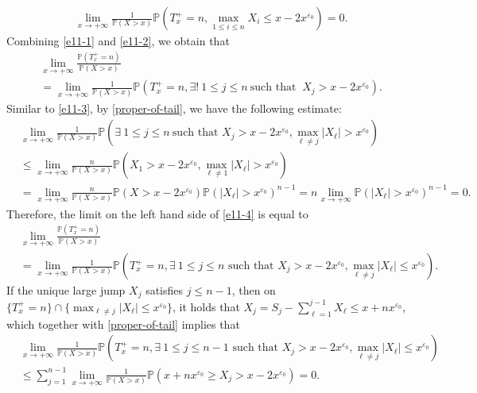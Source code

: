 \documentclass[11pt]{article}
\numberwithin{equation}{section}
\begin{document}
\begin{align}\label{e11-2}
	& \lim_{x\to+\infty} \frac{1}{\mathbb{P}(X>x)} \mathbb{P}\left(T_x^+=n, \max_{1\leq i\leq n} X_i \leq x-2x^{\varepsilon_0}\right)= 0. 
\end{align}
Combining \eqref{e11-1} and \eqref{e11-2}, we obtain that
\begin{align}\label{e11-4}
	& \lim_{x\to+\infty} \frac{\mathbb{P}\left(T_x^+=n\right)}{\mathbb{P}(X>x)} \nonumber\\
	&= \lim_{x\to+\infty} \frac{1}{\mathbb{P}(X>x)}\mathbb{P}\left(T_x^+=n, \exists !\ 1\leq j\leq n\ \mbox{such that } \ X_j > x-2x^{\varepsilon_0}\right).
\end{align}
Similar to \eqref{e11-3}, by \eqref{proper-of-tail}, we have the following estimate:
\begin{align}
	 & \lim_{x\to +\infty} \frac{1}{\mathbb{P}(X>x)}\mathbb{P}\left(\exists\  1\leq j\leq n\ \mbox{such that } X_j>x- 2x^{\varepsilon_0}, \max_{\ell\neq j} |X_\ell| > x^{\varepsilon_0} \right) \nonumber\\
	&\leq \lim_{x\to +\infty} \frac{n}{\mathbb{P}(X>x)}\mathbb{P}\left(X_1>x- 2x^{\varepsilon_0}, \max_{\ell\neq 1} |X_\ell| > x^{\varepsilon_0} \right) \nonumber\\
	&=  \lim_{x\to +\infty} \frac{n}{\mathbb{P}(X>x)} \mathbb{P}\left(X>x- 2x^{\varepsilon_0}\right)\mathbb{P}\left(  |X_\ell| > x^{\varepsilon_0} \right)^{n-1}= n \lim_{x\to +\infty} \mathbb{P}\left(  |X_\ell| > x^{\varepsilon_0 }\right)^{n-1}  =0.
\end{align}
Therefore, the limit on the left hand side of \eqref{e11-4} is equal to 
\begin{align}\label{e11-5}
	& \lim_{x\to+\infty} \frac{\mathbb{P}\left(T_x^+=n\right)}{\mathbb{P}(X>x)} \nonumber\\
	& = \lim_{x\to+\infty} \frac{1}{\mathbb{P}(X>x)}\mathbb{P}\left(T_x^+=n, \exists \ 1\leq j\leq n \mbox{ such that } X_j > x-2x^{\varepsilon_0}, \max_{ \ell\neq j} |X_\ell| \leq x^{\varepsilon_0}\right).
\end{align}
If the unique large jump $X_j$ satisfies $j\leq n-1$, then on $\{T_x^+=n \}\cap \{\max_{\ell\neq j} |X_\ell| \leq x^{\varepsilon_0}\}$, it holds that $X_j =S_j- \sum_{\ell=1}^{j-1}X_\ell \leq x+ nx^{\varepsilon_0}$, which together with \eqref{proper-of-tail} implies that 
\begin{align}\label{e11-6}
	&\lim_{x\to+\infty} \frac{1}{\mathbb{P}(X>x)}\mathbb{P}\left(T_x^+=n, \exists\  1\leq j\leq n-1 \mbox{ such that } X_j > x-2x^{\varepsilon_0}, \max_{ \ell\neq j} |X_\ell| \leq x^{\varepsilon_0}\right) \nonumber\\
	&\leq \sum_{j=1}^{n-1}\lim_{x\to+\infty} \frac{1}{\mathbb{P}(X>x)}\mathbb{P}\left( x+ nx^{\varepsilon_0} \geq X_j > x-2x^{\varepsilon_0}\right) =0.
\end{align}
\end{document}
